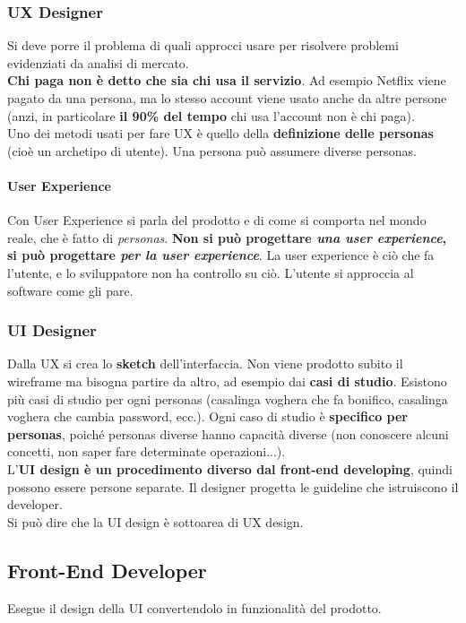 \documentclass[10pt]{article}
\begin{document}
\subsubsection{UX Designer}
Si deve porre il problema di quali approcci usare per risolvere problemi evidenziati da analisi di mercato.\\
\textbf{Chi paga non è detto che sia chi usa il servizio}. Ad esempio Netflix viene pagato da una persona, ma lo stesso account viene usato anche da altre persone (anzi, in particolare \textbf{il 90\% del tempo} chi usa l'account non è chi paga).\\
Uno dei metodi usati per fare UX è quello della \textbf{definizione delle \textbf{personas}} (cioè un archetipo di utente). Una persona può assumere diverse personas.
\paragraph{User Experience} Con User Experience si parla del prodotto e di come si comporta nel mondo reale, che è fatto di \textit{personas}.
\textbf{Non si può progettare \textit{una user experience}, si può progettare \textit{per la user experience}}. La user experience è ciò che fa l'utente, e lo sviluppatore non ha controllo su ciò. L'utente si approccia al software come gli pare.
\subsubsection{UI Designer}
Dalla UX si crea lo \textbf{sketch} dell'interfaccia. Non viene prodotto subito il wireframe ma bisogna partire da altro, ad esempio dai \textbf{casi di studio}. Esistono più casi di studio per ogni personas (casalinga voghera che fa bonifico, casalinga voghera che cambia password, ecc.). Ogni caso di studio è \textbf{specifico per personas}, poiché personas diverse hanno capacità diverse (non conoscere alcuni concetti, non saper fare determinate operazioni...).\\
L'\textbf{UI design è un procedimento diverso dal front-end developing}, quindi possono essere persone separate. Il designer progetta le guideline che istruiscono il developer.\\
Si può dire che la UI design è sottoarea di UX design.\\

\subsection{Front-End Developer}
Esegue il design della UI convertendolo in funzionalità del prodotto.\\
\end{document}
